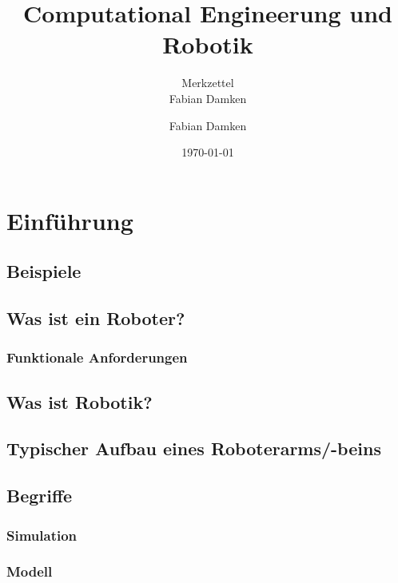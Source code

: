 \documentclass[a4paper, 11pt, accentcolor = tud3b]{tudreport}
\title{Computational Engineerung und Robotik}
\subtitle{Merkzettel \\ Fabian Damken}
\author{Fabian Damken}
\date{\today}
\begin{document}
    \maketitle
    \tableofcontents
    \listoftodos

    \chapter{Einführung} %

        \section{Beispiele} %

        \section{Was ist ein Roboter?} %

            \subsection{Funktionale Anforderungen} %

        \section{Was ist Robotik?} %

        \section{Typischer Aufbau eines Roboterarms/-beins} %

        \section{Begriffe} %

            \subsection{Simulation} %

            \subsection{Modell} %
\end{document}
